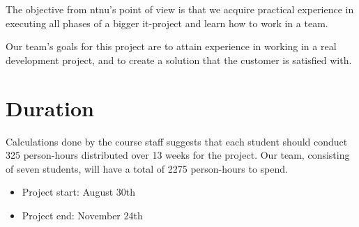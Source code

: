 The objective from \Gls{ntnu}'s point of view is that we acquire practical experience in executing all phases of a bigger \Gls{it}-project and learn
how to work in a team.

Our team's goals for this project are to attain experience in working in a real development project, and to create a solution that the customer
is satisfied with.

\section{Duration}
Calculations done by the course staff suggests that each student should conduct 325 person-hours distributed over 13 weeks for the project. Our team, consisting of seven students, will have a total of 2275 person-hours to spend.\\
\begin {itemize}
	\item Project start: August 30th
	\item Project end: November 24th
\end{itemize}

